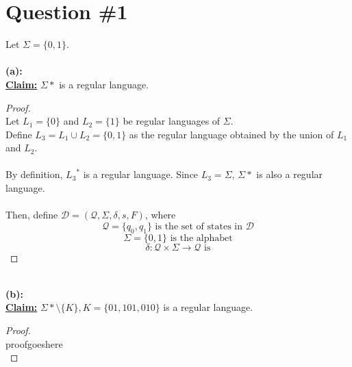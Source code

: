 \documentclass[12pt]{article}
\begin{document}
\renewcommand{\familydefault}{\rmdefault}



\pagebreak
\normalsize

\section*{Question \#1}
Let $\Sigma = \{ 0, 1 \} $. \\
\\
\textbf{(a):} \\
\textbf{\underline{Claim:}} $\Sigma*$ is a regular language.
\begin{proof}
\leavevmode\\
    Let $L_1 = \{0\}$ and $L_2 = \{1\}$ be regular languages of $\Sigma$. \\
    Define $L_3 = L_1 \cup L_2 = \{ 0, 1 \}$ as the regular language obtained by the union of $L_1$ and $L_2$. \\
    \\
    By definition, ${L_3}^*$ is a regular language. Since ${L_3} = \Sigma$, $\Sigma*$ is also a regular language. \\
    \\
    Then, define $\mathcal{D} = (\mathcal{Q}, \Sigma, \delta, s, F)$, where
    \[
        \mathcal{Q} = \{ q_0, q_1 \} \text{ is the set of states in } \mathcal{D}
    \]
    \[
        \Sigma = \{ 0, 1 \} \text{ is the alphabet}
    \]
    \[
        \delta : \mathcal{Q} \times \Sigma \to \mathcal{Q} \text{ is}
    \]
\end{proof}
\leavevmode\\
\textbf{(b):} \\
\textbf{\underline{Claim:}} $\Sigma* \setminus \{ K \}, K = \{ 01, 101, 010 \}$ is a regular language.
\begin{proof}
\leavevmode\\
    proofgoeshere \\
\end{proof}
\end{document}
